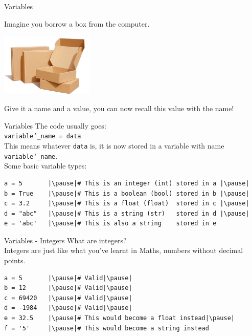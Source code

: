 \documentclass[dvipsnames, svgnames, x11names]{beamer}
\begin{document}
\begin{frame}[fragile]{Variables}
\begin{center}
Imagine you borrow a box from the computer.

\includegraphics[height=3cm]{box}

\pause
Give it a name and a value, you can now recall this value with the name!
\end{center}
\end{frame}

\begin{frame}[fragile]{Variables}
The code usually goes:\\
\texttt{variable\char`\_name = data}\\
This means whatever \texttt{data} is, it is now stored in a variable with name \texttt{variable\char`\_name}.
\vspace{1em}\\
Some basic variable types:
\begin{verbatim}
a = 5       |\pause|# This is an integer (int) stored in a |\pause|
b = True    |\pause|# This is a boolean (bool) stored in b |\pause|
c = 3.2     |\pause|# This is a float (float)  stored in c |\pause|
d = "abc"   |\pause|# This is a string (str)   stored in d |\pause|
e = 'abc'   |\pause|# This is also a string    stored in e
\end{verbatim}
\end{frame}

\begin{frame}[fragile]{Variables - Integers}
What are integers?\pause\\
Integers are just like what you've learnt in Maths, numbers without decimal points.\pause
\begin{verbatim}
a = 5       |\pause|# Valid|\pause|
b = 12      |\pause|# Valid|\pause|
c = 69420   |\pause|# Valid|\pause|
d = -1984   |\pause|# Valid|\pause|
e = 32.5    |\pause|# This would become a float instead|\pause|
f = '5'     |\pause|# This would become a string instead
\end{verbatim}
\end{frame}
\end{document}
